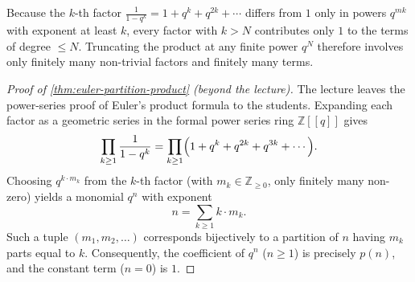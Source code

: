 \begin{content}

\begin{steps}
Because the $k$-th factor $\frac{1}{1 - q^k} = 1 + q^k + q^{2k} + \cdots$ differs from $1$ only in powers $q^{mk}$ with exponent at least $k$, every factor with $k > N$ contributes only $1$ to the terms of degree $\le N$. Truncating the product at any finite power $q^N$ therefore involves only finitely many non-trivial factors and finitely many terms.
\end{steps}

\begin{proof}[Proof of \cref{thm:euler-partition-product} (beyond the lecture)]
The lecture leaves the power-series proof of Euler's product formula to the students. Expanding each factor as a geometric series in the formal power series ring $\mathbb{Z}[[q]]$ gives
\[
\prod_{k \ge 1} \frac{1}{1 - q^k} = \prod_{k \ge 1} \Bigl(1 + q^k + q^{2k} + q^{3k} + \cdots\Bigr).
\]
Choosing $q^{k \cdot m_k}$ from the $k$-th factor (with $m_k \in \mathbb{Z}_{\ge 0}$, only finitely many non-zero) yields a monomial $q^n$ with exponent
\[
n = \sum_{k \ge 1} k \cdot m_k.
\]
Such a tuple $(m_1, m_2, \dots)$ corresponds bijectively to a partition of $n$ having $m_k$ parts equal to $k$. Consequently, the coefficient of $q^n$ ($n \ge 1$) is precisely $p(n)$, and the constant term ($n = 0$) is $1$.
\end{proof}
\end{content}

